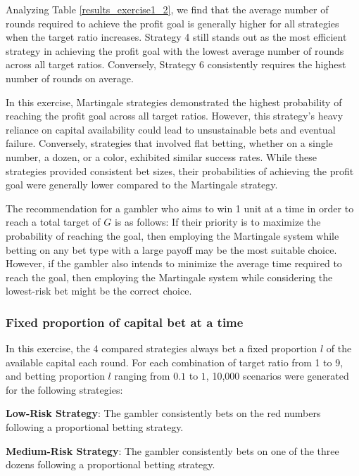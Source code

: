 \documentclass[11pt,twoside]{article}
\numberwithin{Theorem}{section}
\numberwithin{Definition}{section}
\numberwithin{Lemma}{section}
\numberwithin{Algorithm}{section}
\numberwithin{equation}{section}
\begin{document}
Analyzing Table \ref{results_exercise1_2}, we find that the average number of rounds required to achieve the profit goal is generally higher for all strategies when the target ratio increases. Strategy 4 still stands out as the most efficient strategy in achieving the profit goal with the lowest average number of rounds across all target ratios. Conversely, Strategy 6 consistently requires the highest number of rounds on average.

In this exercise, Martingale strategies demonstrated the highest probability of reaching the profit goal across all target ratios. However, this strategy's heavy reliance on capital availability could lead to unsustainable bets and eventual failure. Conversely, strategies that involved flat betting, whether on a single number, a dozen, or a color, exhibited similar success rates. While these strategies provided consistent bet sizes, their probabilities of achieving the profit goal were generally lower compared to the Martingale strategy.

The recommendation for a gambler who aims to win 1 unit at a time in order to reach a total target of $G$ is as follows: If their priority is to maximize the probability of reaching the goal, then employing the Martingale system while betting on any bet type with a large payoff may be the most suitable choice. However, if the gambler also intends to minimize the average time required to reach the goal, then employing the Martingale system while considering the lowest-risk bet might be the correct choice.

\subsubsection{Fixed proportion of capital bet at a time}
In this exercise, the 4 compared strategies always bet a fixed proportion $l$ of the available capital each round. For each combination of target ratio from 1 to 9, and betting proportion $l$ ranging from $0.1$ to $1$, 10,000 scenarios were generated for the following strategies:

\begin{tcolorbox}[colback=gray!10,boxrule=0.25pt]
\textbf{Low-Risk Strategy}: The gambler consistently bets on the red numbers following a proportional betting strategy.
\end{tcolorbox}

\begin{tcolorbox}[colback=gray!10,boxrule=0.25pt]
\textbf{Medium-Risk Strategy}: The gambler consistently bets on one of the three dozens following a proportional betting strategy.
\end{tcolorbox}
\end{document}
